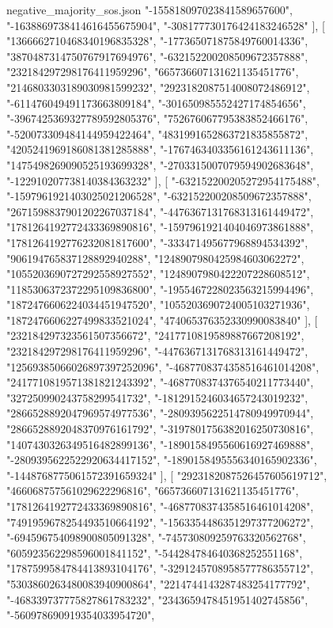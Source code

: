 \begin{filecontents*}[overwrite]{negative_majority_sos.json}
    "-155818097023841589657600",
    "-1638869738414616455675904",
    "-308177730176424183246528"
   ],
   [
    "1366662710468340196835328",
    "-177365071875849760014336",
    "3870487314750767917694976",
    "-632152200208509672357888",
    "232184297298176411959296",
    "665736607131621135451776",
    "2146803303189030981599232",
    "2923182087514008072486912",
    "-611476049491173663809184",
    "-301650985552427174854656",
    "-3967425369327789592805376",
    "752676067795383852466176",
    "-520073309484144959422464",
    "4831991652863721835855872",
    "4205241969186081381285888",
    "-1767463403356161243611136",
    "1475498269090525193699328",
    "-2703315007079594902683648",
    "-122910207738140384363232"
   ],
   [
    "-632152200205272954175488",
    "-1597961921403025021206528",
    "-632152200208509672357888",
    "2671598837901202267037184",
    "-4476367131768313161449472",
    "1781264192772433369890816",
    "-1597961921404046973861888",
    "1781264192776232081817600",
    "-333471495677968894534392",
    "906194765837128892940288",
    "1248907980425984603062272",
    "1055203690727292558927552",
    "1248907980422207228608512",
    "1185306372372295109836800",
    "-1955467228023563215994496",
    "1872476606224034451947520",
    "1055203690724005103271936",
    "1872476606227499833521024",
    "474065376352330990083840"
   ],
   [
    "232184297323561507356672",
    "2417710819589887667208192",
    "232184297298176411959296",
    "-4476367131768313161449472",
    "12569385066026897397252096",
    "-4687708374358516461014208",
    "2417710819571381821243392",
    "-4687708374376540211773440",
    "327250990243758299541732",
    "-1812915246034657243019232",
    "2866528892047969574977536",
    "-2809395622514780949970944",
    "2866528892048370976161792",
    "-3197801756382016250730816",
    "1407430326349516482899136",
    "-1890158495560616927469888",
    "-2809395622522920634417152",
    "-1890158495556340165902336",
    "-1448768775061572391659324"
   ],
   [
    "2923182087526457605619712",
    "466068757561029622296816",
    "665736607131621135451776",
    "1781264192772433369890816",
    "-4687708374358516461014208",
    "7491959678254493510664192",
    "-1563354486351297377206272",
    "-694596754098900805091328",
    "-745730809259763320562768",
    "605923562298596001841152",
    "-544284784640368252551168",
    "1787599584784413893104176",
    "-3291245708958577786355712",
    "5303860263480083940900864",
    "2214744143287483254177792",
    "-468339737775827861783232",
    "2343659478451951402745856",
    "-560978690919354033954720",

\end{filecontents*}
